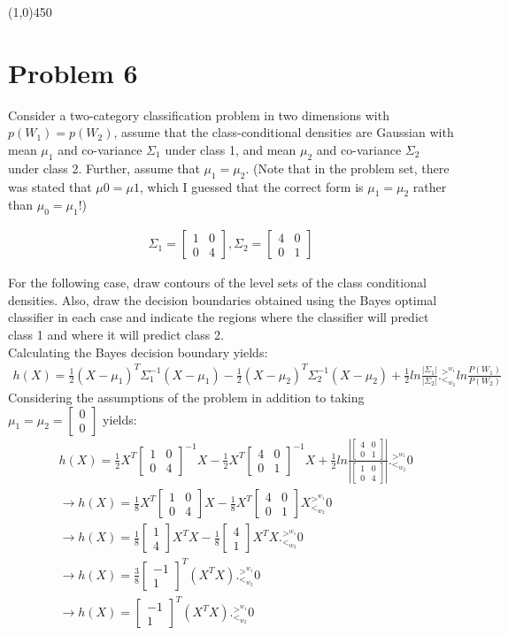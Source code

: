 \documentclass[12pt]{article}
\newcommand{\gl}{^{>^{w_1}}_{<_{w_2}}}
\newcommand{\svector}[2]{\left[ \begin{matrix} #1 \\ #2 \end{matrix}\right]}
\newcommand{\smatrix}[4]{\left[ \begin{matrix} #1 & #2 \\ #3 & #4 \end{matrix}\right]}
\begin{document}
\begin{center}
\line(1,0){450}
\end{center}


\section{Problem 6}
Consider a two-category classification problem in two dimensions with $p(W_1 ) = p(W_2 )$,
assume that the class-conditional densities are Gaussian with mean $\mu_1$ and
co-variance $\Sigma_1$ under class 1, and mean $\mu_2$ and co-variance $\Sigma_2$ under class 2. Further, assume that $\mu_1 = \mu_2$. (Note that in the problem set, there was stated that $\mu0 = \mu1$, which I guessed that the correct form is $\mu_1 = \mu_2 $ rather than $\mu_0 = \mu_1$!)

\begin{align*}
\Sigma_1 = \smatrix{1}{0}{0}{4}, \Sigma_2 = \smatrix{4}{0}{0}{1}
\end{align*}

For the following case, draw contours of the level sets of the class conditional densities.
Also, draw the decision boundaries obtained using the Bayes optimal classifier in each case
and indicate the regions where the classifier will predict class 1 and where it will predict
class 2. \\

Calculating the Bayes decision boundary yields:
\begin{align*}
h(X) = \frac{1}{2}(X - \mu_1)^T\Sigma_1^{-1}(X - \mu_1) - \frac{1}{2} (X-\mu_2)^T\Sigma_2^{-1}(X-\mu_2) + \frac{1}{2} ln \frac{|\Sigma_1|}{|\Sigma_2|} .\gl ln \frac{P(W_1)}{P(W_2)}
\end{align*}
Considering the assumptions of the problem in addition to taking $\mu_1 = \mu_2 = \svector{0}{0}$ yields:
\begin{align*}
&h(X) = \frac{1}{2}X^T\smatrix{1}{0}{0}{4}^{-1}X - \frac{1}{2} X^T\smatrix{4}{0}{0}{1}^{-1}X + \frac{1}{2} ln \frac{|\smatrix{4}{0}{0}{1}|}{|\smatrix{1}{0}{0}{4}|} .\gl 0 \\
&\rightarrow h(X) = \frac{1}{8}X^T\smatrix{1}{0}{0}{4}X - \frac{1}{8}X^T\smatrix{4}{0}{0}{1}X\gl 0 \\
&\rightarrow h(X) = \frac{1}{8}\svector{1}{4}X^TX - \frac{1}{8}\svector{4}{1}X^TX .\gl 0 \\
&\rightarrow h(X) = \frac{3}{8}\svector{-1}{1}^T(X^TX) .\gl 0\\
&\rightarrow h(X) = \svector{-1}{1}^T(X^TX) .\gl 0\\
\end{align*}
\end{document}
